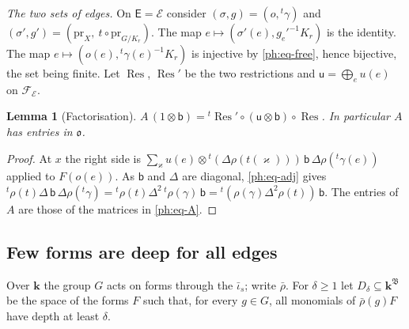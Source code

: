 \documentclass[10pt]{amsart}
\newtheorem{lemma}[theorem]{Lemma}
\theoremstyle{definition}
\theoremstyle{remark}
\providecommand{\pao}{\mathfrak o}
\providecommand{\phB}{\mathfrak B}
\providecommand{\phk}{\boldsymbol k}
\begin{document}
\emph{The two sets of edges.} On $\mathsf E=\mathcal E$ consider $(\sigma,g)=(o,{}^t\gamma)$ and
$(\sigma',g')=(\mathrm{pr}_X,\ t\circ\mathrm{pr}_{G/K_r})$. The map $e\mapsto(\sigma'(e),
g_e'^{-1}K_r)$ is the identity. The map $e\mapsto(o(e),{}^t\gamma(e)^{-1}K_r)$ is injective by
\eqref{ph:eq-free}, hence bijective, the set being finite. Let $\operatorname{Res}$,
$\operatorname{Res}'$ be the two restrictions and $\mathsf u=\bigoplus_eu(e)$ on
$\mathcal F_{\mathcal E}$.

\begin{lemma}[Factorisation]\label{ph:fact}
$A\,(1\otimes\mathsf b)={}^t\operatorname{Res}'\circ(\mathsf u\otimes\mathsf b)\circ
\operatorname{Res}$. In particular $A$ has entries in $\pao$.
\end{lemma}
\begin{proof}
At $x$ the right side is $\sum_\varkappa u(e)\otimes{}^t(\Delta\rho(t(\varkappa)))\,\mathsf b\,
\Delta\rho({}^t\gamma(e))$ applied to $F(o(e))$. As $\mathsf b$ and $\Delta$ are diagonal,
\eqref{ph:eq-adj} gives ${}^t\rho(t)\Delta\,\mathsf b\,\Delta\rho({}^t\gamma)={}^t\rho(t)\Delta^2\,
{}^t\rho(\gamma)\,\mathsf b={}^t(\rho(\gamma)\Delta^2\rho(t))\,\mathsf b$. The entries of $A$ are
those of the matrices in \eqref{ph:eq-A}.
\end{proof}

\subsection{Few forms are deep for all edges}\label{ph:ss-depth}
Over $\phk$ the group $G$ acts on forms through the $\bar\iota_s$; write $\bar\rho$. For
$\delta\ge1$ let $D_\delta\subseteq\phk^\phB$ be the space of the forms $F$ such that, for every
$g\in G$, all monomials of $\bar\rho(g)F$ have depth at least $\delta$.
\end{document}
